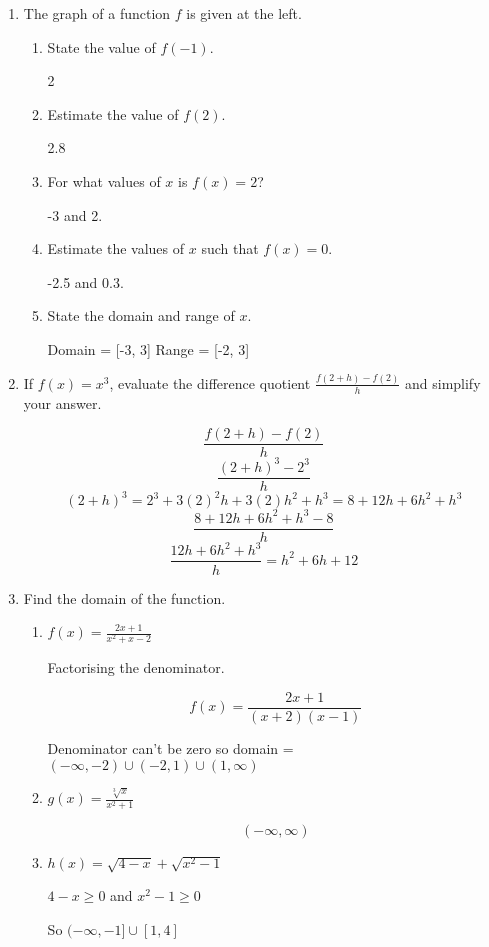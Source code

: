 \documentclass{article}
\begin{document}
\begin{enumerate}
	\item The graph of a function $f$ is given at the left.

	\begin{enumerate}
		\item State the value of $f(-1)$.

			2

		\item Estimate the value of $f(2)$.

			2.8

		\item For what values of $x$ is $f(x) = 2$?

			-3 and 2.

		\item Estimate the values of $x$ such that $f(x) = 0$.

			-2.5 and 0.3.

		\item State the domain and range of $x$.

			Domain = [-3, 3]
			Range = [-2, 3]
		
	\end{enumerate}

	\item If $f(x) = x^{3}$, evaluate the difference quotient $\frac{f(2 + h) - f(2)}{h}$ and simplify your answer.

		$$\frac{f(2 + h) - f(2)}{h}$$
		$$\frac{(2 + h)^3 - 2^3}{h}$$
		$$(2 + h)^3 = 2^3 + 3(2)^2h + 3(2)h^2 +  h^3 = 8 + 12h + 6h^2 + h^3$$
		$$\frac{ 8 + 12h + 6h^2 + h^3 - 8}{h}$$
		$$\frac{12h + 6h^2 + h^3}{h} = h^2 + 6h + 12$$

	\item Find the domain of the function.

	\begin{enumerate}
		\item $f(x) = \frac{2x + 1}{x^2 + x - 2}$

			Factorising the denominator.

			$$f(x) = \frac{2x + 1}{(x+2)(x-1)}$$
			
			Denominator can't be zero so domain = $(-\infty, -2) \cup (-2, 1) \cup (1,\infty)$

		\item $g(x) = \frac{\sqrt[3]{x}}{x^2 + 1}$

			$$(-\infty, \infty)$$

		\item $h(x) = \sqrt{4 - x} + \sqrt{x^2 - 1}$

		$4 - x \geq 0$ and $x^2 - 1 \geq 0$

		So $(-\infty, -1] \cup [1, 4]$
	\end{enumerate}
		
\end{enumerate}
\end{document}
